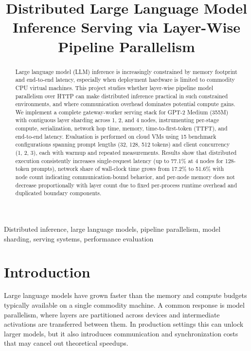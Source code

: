 \documentclass[conference]{IEEEtran}
\begin{document}
\title{Distributed Large Language Model Inference Serving via Layer-Wise Pipeline Parallelism}

\author{
}

\maketitle

\begin{abstract}
Large language model (LLM) inference is increasingly constrained by memory footprint and end-to-end latency, especially when deployment hardware is limited to commodity CPU virtual machines. This project studies whether layer-wise pipeline model parallelism over HTTP can make distributed inference practical in such constrained environments, and where communication overhead dominates potential compute gains. We implement a complete gateway-worker serving stack for GPT-2 Medium (355M) with contiguous layer sharding across 1, 2, and 4 nodes, instrumenting per-stage compute, serialization, network hop time, memory, time-to-first-token (TTFT), and end-to-end latency. Evaluation is performed on cloud VMs using 15 benchmark configurations spanning prompt lengths (32, 128, 512 tokens) and client concurrency (1, 2, 3), each with warmup and repeated measurements. Results show that distributed execution consistently increases single-request latency (up to 77.1\% at 4 nodes for 128-token prompts), network share of wall-clock time grows from 17.2\% to 51.6\% with node count indicating communication-bound behavior, and per-node memory does not decrease proportionally with layer count due to fixed per-process runtime overhead and duplicated boundary components.
\end{abstract}

\begin{IEEEkeywords}
Distributed inference, large language models, pipeline parallelism, model sharding, serving systems, performance evaluation
\end{IEEEkeywords}

\section{Introduction}
Large language models have grown faster than the memory and compute budgets typically available on a single commodity machine. A common response is model parallelism, where layers are partitioned across devices and intermediate activations are transferred between them. In production settings this can unlock larger models, but it also introduces communication and synchronization costs that may cancel out theoretical speedups.
\end{document}
